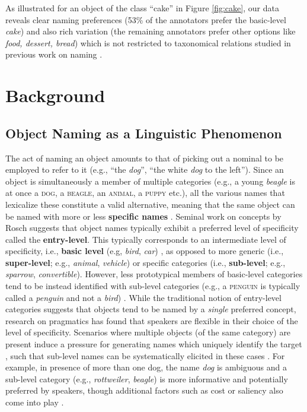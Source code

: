 \documentclass[10pt, a4paper]{article}
\newcommand{\refexp}[1]{\textsl{#1}}
\newcommand{\cat}[1]{\textsc{#1}}
\begin{document}
As illustrated for an object of the class ``cake'' in Figure \ref{fig:cake}, our data reveals clear naming preferences (53\% of the annotators prefer the basic-level \textit{cake}) and also rich variation (the remaining annotators prefer other options like \textit{food, dessert, bread}) which is not restricted to taxonomical relations studied in previous work on naming \cite{rosch1976basic,Ordonez:2016,graf2016animal}.


\section{Background}

\subsection{Object Naming as a Linguistic Phenomenon}

The act of naming an object amounts to that of picking out a nominal to be employed to refer to it (e.g., ``the \refexp{dog}'', ``the white \refexp{dog} to the left'').
Since an object is simultaneously a member of multiple categories (e.g., a young \refexp{beagle} is at once a \cat{dog}, a \cat{beagle}, an \cat{animal}, a \cat{puppy} etc.), all the various names that lexicalize these constitute a valid alternative, meaning that the same object can be named with more or less \textbf{specific names} \cite{brown1958shall,murphy2004big}. 
Seminal work on concepts by Rosch suggests that object names typically exhibit a preferred level of specificity called the \textbf{entry-level}. This typically corresponds to an intermediate level of specificity, i.e., \textbf{basic level} (e.g, \refexp{bird}, \refexp{car}) \cite{rosch1976basic}, as opposed to more generic (i.e., \textbf{super-level}; e.g., \refexp{animal}, \refexp{vehicle}) or specific categories (i.e., \textbf{sub-level}; e.g., \refexp{sparrow}, \refexp{convertible}). However, less prototypical members of basic-level categories tend to be instead identified with sub-level categories (e.g., a \cat{penguin} is typically called a \refexp{penguin} and not a \refexp{bird}) \cite{jolicoeur1984pictures}. 
While the traditional notion of entry-level categories suggests that objects tend to be named by a \refexp{single} preferred concept, research on pragmatics has found that speakers are flexible in  
their choice of the level of specificity. 
Scenarios where multiple objects (of the same category) are present induce a pressure for generating names which uniquely identify the target \cite{olson1970language}, such that sub-level names can be systematically elicited in these cases %
\cite{rohde2012communicating}\cite{graf2016animal}.
For example, in presence of more than one dog, the name \textsl{dog} is ambiguous and a sub-level category (e.g., \textsl{rottweiler}, \textsl{beagle}) is more informative and potentially preferred by speakers, though additional factors such as cost or saliency also come into play \cite{graf2016animal}\cite{clark1983common}.
\end{document}
